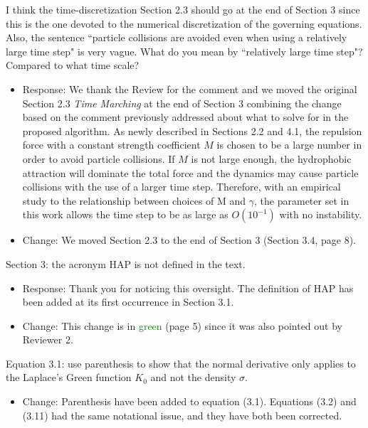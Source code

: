 \documentclass[11pt]{article}
\newcommand{\comment}[1]{{\color{blue} #1}}
\begin{document}
\noindent
\comment{I think the time-discretization Section 2.3 should go at the
end of Section 3 since this is the one devoted to the numerical
discretization of the governing equations. Also, the sentence ``particle
collisions are avoided even when using a relatively large time step" is
very vague.  What do you mean by ``relatively large time step"? Compared
to what time scale?}
\begin{itemize}
  \item Response: We thank the Review for the comment and we moved the original Section 2.3 {\it Time Marching} at the end of Section 3 combining the change based on the comment previously addressed about what to solve for in the proposed algorithm. 
As newly described in Sections 2.2 and 4.1, the repulsion force with a constant strength coefficient $M$ is chosen 
to be a large number in order to avoid particle collisions. If $M$ is not large enough, the hydrophobic attraction will dominate the total force and the dynamics may cause particle collisions with the use of a larger time step. Therefore, with an empirical study to the relationship between 
choices of M and $\gamma$, the parameter set in this work allows the time step to be as large as
$O(10^{-1})$ with no instability.
\item Change: We moved Section 2.3 to the end of Section 3 (Section 3.4, page 8).
\end{itemize}

\noindent
\comment{Section 3: the acronym HAP is not defined in the text.}
\begin{itemize}
  \item Response: Thank you for noticing this oversight. The definition of HAP has
    been added at its first occurrence in Section 3.1. 
  \item Change: This change is in \textcolor{green}{green} (page 5) since it was also pointed
    out by Reviewer 2.
\end{itemize}

\noindent
\comment{Equation 3.1: use parenthesis to show that the normal
derivative only applies to the Laplace’s Green function $K_0$ and not
the density $\sigma$.}
\begin{itemize}
  \item Change: Parenthesis have been added to equation (3.1).  Equations (3.2) and (3.11) had the same notational issue, and
    they have both been corrected.
\end{itemize}
\end{document}
